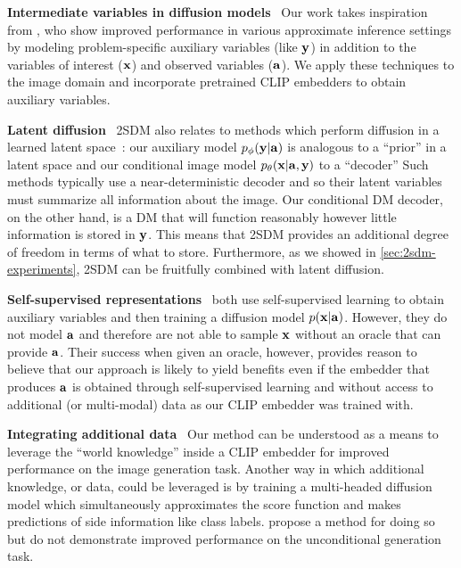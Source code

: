 \textbf{Intermediate variables in diffusion models}~
 Our work takes inspiration from \citet{weilbach2023graphically}, %
who show improved performance in various approximate inference settings by modeling problem-specific auxiliary variables (like ${\mathbf{y}}$) in addition to the variables of interest (${\mathbf{x}}$) and observed variables (${\mathbf{a}}$). We apply these techniques to the image domain and incorporate pretrained CLIP embedders to obtain auxiliary variables. 

\textbf{Latent diffusion}~
2SDM also relates to methods which perform diffusion in a learned latent space~\citep{rombach2022high}: our auxiliary model $p_\phi({\mathbf{y}}|{\mathbf{a}})$ is analogous to a ``prior'' in a latent space and our conditional image model $p_\theta({\mathbf{x}}|{\mathbf{a}},{\mathbf{y}})$ to a ``decoder'' Such methods typically use a near-deterministic decoder and so their latent variables must summarize all information about the image. Our conditional DM decoder, on the other hand, is a DM that will function reasonably however little information is stored in ${\mathbf{y}}$. This means that 2SDM provides an additional degree of freedom in terms of what to store. Furthermore, as we showed in \cref{sec:2sdm-experiments}, 2SDM can be fruitfully combined with latent diffusion.

\textbf{Self-supervised representations}~
\citet{bao2022conditional,hu2022self} both use self-supervised learning to obtain auxiliary variables and then training a diffusion model $p({\mathbf{x}}|{\mathbf{a}})$. However, they do not model ${\mathbf{a}}$ and therefore are not able to sample ${\mathbf{x}}$ without an oracle that can provide ${\mathbf{a}}$. Their success when given an oracle, however, provides reason to believe that our approach is likely to yield benefits even if the embedder that produces ${\mathbf{a}}$ is obtained through self-supervised learning and without access to additional (or multi-modal) data as our CLIP embedder was trained with.

\textbf{Integrating additional data}~
Our method can be understood as a means to leverage the ``world knowledge'' inside a CLIP embedder for improved performance on the image generation task. Another way in which additional knowledge, or data, could be leveraged is by training a multi-headed diffusion model which simultaneously approximates the score function and makes predictions of side information like class labels. \citet{deja2023learning} propose a method for doing so but do not demonstrate improved performance on the unconditional generation task.

